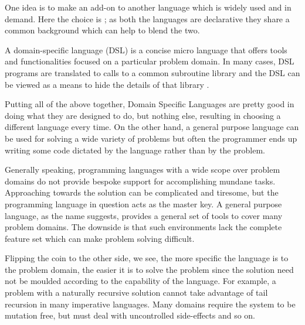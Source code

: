 \documentclass[thesis-solanki.tex]{subfiles}
\begin{document}
One idea is to make  an add-on to another language which is widely used and in demand.
Here the choice is ; as both the languages are declarative they share a common background which can
help to blend the two.

A domain-specific language (DSL) is a concise micro language that offers tools and functionalities focused on a particular problem domain. In many cases, DSL programs are translated to calls to a common subroutine library and the DSL can be viewed as a means to hide the details of that library \cite{van2000domain}.

Putting all of the above together, Domain Specific Languages
are pretty good in doing what they are designed to do, but nothing else, resulting in choosing a different language
every time.
On the other hand, a general purpose language can be used for solving a wide variety of problems but often the
programmer ends up writing some code dictated by the language rather than by the problem.

Generally speaking, programming languages with a wide scope over problem domains do not provide bespoke support for
accomplishing  mundane tasks.
Approaching towards the solution can be complicated and tiresome, but the programming language in question acts as the
master key.
A general purpose language, as the name suggests,
provides a general set of tools to cover many
problem domains.
The downside is that such environments
lack the complete feature set which can make problem solving difficult.

Flipping the coin to the other side, we see, the more specific the language is to the problem domain, the easier it
is to solve the problem since the solution need not be moulded according to the capability  of the
language.
For example, a problem with a naturally recursive solution cannot take advantage of tail recursion in many
imperative languages.
Many domains require the system to be mutation free, but must deal with uncontrolled side-effects and so
on.
\end{document}
